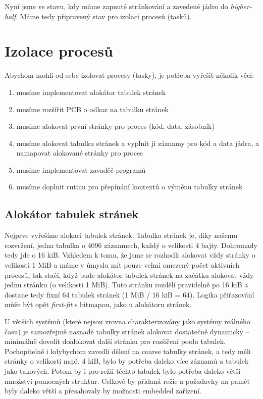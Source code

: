 \documentclass{article}
\begin{document}
Nyní jsme ve stavu, kdy máme zapnuté stránkování a zavedené jádro do \emph{higher-half}. Máme tedy připravený stav pro izolaci procesů (tasků).

\section{Izolace procesů}

Abychom mohli od sebe izolovat procesy (tasky), je potřeba vyřešit několik věcí:
\begin{enumerate}
	\item musíme implementovat alokátor tabulek stránek
	\item musíme rozšířit PCB o odkaz na tabulku stránek
	\item musíme alokovat první stránky pro proces (kód, data, zásobník)
	\item musíme alokovat tabulku stránek a vyplnit ji záznamy pro kód a data jádra, a namapovat alokované stránky pro proces
	\item musíme implementovat zavaděč programů
	\item musíme doplnit rutinu pro přepínání kontextů o výměnu tabulky stránek
\end{enumerate}

\subsection{Alokátor tabulek stránek}

Nejprve vyřešíme alokaci tabulek stránek. Tabulka stránek je, díky našemu rozvržení, jedna tabulka o 4096 záznamech, každý o velikosti 4 bajty. Dohromady tedy jde o 16 kiB. Vzhledem k tomu, že jsme se rozhodli alokovat vždy stránky o velikosti 1 MiB a máme v úmyslu mít pouze velmi omezený počet aktivních procesů, tak stačí, když bude alokátor tabulek stránek na začátku alokovat vždy jednu stránku (o velikosti 1 MiB). Tuto stránku rozdělí pravidelně po 16 kiB a dostane tedy fixní  64 tabulek stránek (1 MiB / 16 kiB = 64). Logika přiřazování může být opět \emph{first-fit} s bitmapou, jako u alokátoru stránek.

U větších systémů (které nejsou zrovna charakterizovány jako systémy reálného času) je samozřejmě nasnadě tabulky stránek alokovat dostatečně dynamicky -- minimálně dovolit doalokovat další stránku pro rozšíření poolu tabulek. Pochopitelně i kdybychom zavedli dělení na coarse tabulky stránek, a tedy měli stránky o velikosti např. 4 kiB, bylo by potřeba daleko více záznamů a tabulek jako takových. Potom by i pro režii těchto tabulek bylo potřeba daleko větší množství pomocných struktur. Celkově by přidaná režie a požadavky na paměť byly daleko větší a přesahovaly by možnosti embedded zařízení.
\end{document}
